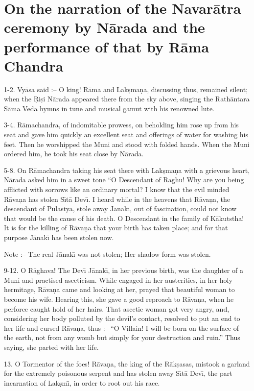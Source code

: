 \chapter{On the narration of the Navar\=atra ceremony by N\=arada and the performance of that by R\=ama Chandra}

1-2. Vy\=asa said :-- O king! R\=ama and Lak\d{s}ma\d{n}a, discussing thus, remained silent; when the \d{R}i\d{s}i N\=arada appeared there from the sky above, singing the Rath\=antara S\=ama Veda hymns in tune and musical gamut with his renowned lute.

3-4. R\=amachandra, of indomitable prowess, on beholding him rose up from his seat and gave him quickly an excellent seat and offerings of water for washing his feet. Then he worshipped the Muni and stood with folded hands. When the Muni ordered him, he took his seat close by N\=arada.

5-8. On R\=amachandra taking his seat there with Lak\d{s}ma\d{n}a with a grievous heart, N\=arada asked him in a sweet tone ``O Descendant of Raghu! Why are you being afflicted with sorrows like an ordinary mortal? I know that the evil minded R\=ava\d{n}a has stolen S\={\i}t\=a Dev\={\i}. I heard while in the heavens that R\=ava\d{n}a, the descendant of Pulastya, stole away J\=anak\={\i}, out of fascination, could not know that would be the cause of his death. O Descendant in the family of K\=akutstha! It is for the killing of R\=ava\d{n}a that your birth has taken place; and for that purpose J\=anak\={\i} has been stolen now.

Note :-- The real J\=anak\={\i} was not stolen; Her shadow form was stolen.

9-12. O R\=aghava! The Dev\={\i} J\=anak\={\i}, in her previous birth, was the daughter of a Muni and practised asceticism. While engaged in her austerities, in her holy hermitage, R\=ava\d{n}a came and looking at her, prayed that beautiful woman to become his wife. Hearing this, she gave a good reproach to R\=ava\d{n}a, when he perforce caught hold of her hairs. That ascetic woman got very angry, and, considering her body polluted by the devil's contact, resolved to put an end to her life and cursed R\=ava\d{n}a, thus :-- ``O Villain! I will be born on the surface of the earth, not from any womb but simply for your destruction and ruin.'' Thus saying, she parted with her life.

13. O Tormentor of the foes! R\=ava\d{n}a, the king of the R\=ak\d{s}asas, mistook a garland for the extremely poisonous serpent and has stolen away S\={\i}t\=a Dev\={\i}, the part incarnation of Lak\d{s}m\={\i}, in order to root out his race.


